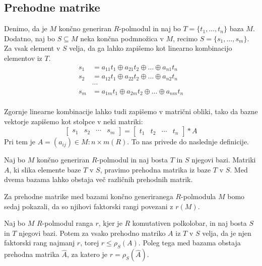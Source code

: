 \documentclass[mat1]{fmfdelo}
\begin{document}
\subsection{Prehodne matrike}
Denimo, da je $M$ končno generiran $R$-polmodul in naj bo $T = \{t_1, \ldots, t_n\}$ baza $M$. Dodatno, naj bo $S\subseteq M$ neka končna podmnožica v $M$, recimo $S = \{s_1, \ldots, s_m\}$. Za vsak element v $S$ velja, da ga lahko zapišemo kot linearno kombinacijo elementov iz $T$. \begin{align*}
	s_1 &= a_{11}t_1 \oplus a_{21}t_2 \oplus \ldots \oplus a_{n1}t_n \\
	s_2 &= a_{12}t_1 \oplus a_{22}t_2 \oplus \ldots \oplus a_{n2}t_n \\
	&\cdots \\
	s_m &= a_{1m}t_1 \oplus a_{2m}t_2 \oplus \ldots \oplus a_{nm}t_n \\
\end{align*}

Zgornje linearne kombinacije lahko tudi zapišemo v matrični obliki, tako da bazne vektorje zapišemo kot stolpce v neki matriki:$$\begin{bmatrix*}
	s_1 & s_2 & \cdots & s_m
\end{bmatrix*} = \begin{bmatrix*}
t_1 & t_2 & \cdots & t_n
\end{bmatrix*} * A$$ 
Pri tem je $A=(a_{ij})\in M:{n\times m}(R)$.
To nas privede do naslednje definicije.

\begin{definicija}\label{def:prehodmat}
	Naj bo $M$ končno generiran $R$-polmodul in naj bosta $T$ in $S$ njegovi bazi. Matriki $A$, ki slika elemente baze $T$ v $S$, pravimo prehodna matrika iz baze $T$ v $S$. Med dvema bazama lahko obstaja več različnih prehodnih matrik.
\end{definicija}

Za prehodne matrike med bazami končno generiranega $R$-polmodula $M$ bomo sedaj pokazali, da so njihovi faktorski rangi povezani z $r(M)$.

\begin{trditev}\label{trd:transmatfakrang}
	Naj bo $M$ $R$-polmodul ranga $r$, kjer je $R$ komutativen polkolobar, in naj bosta $S$ in $T$ njegovi bazi. Potem za vsako prehodno matriko $A$ iz $T$ v $S$ velja, da je njen faktorski rang najmanj $r$, torej $r \leq \rho_S(A)$. Poleg tega med bazama obstaja prehodna matrika $\widehat{A}$, za katero je $r = \rho_S(\widehat{A})$.
\end{trditev}
\end{document}
